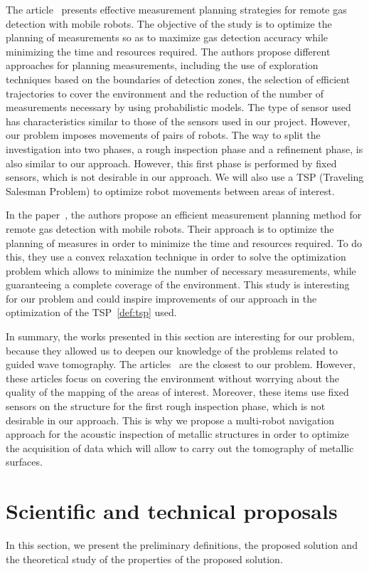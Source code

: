 \documentclass[english,RandD]{rapportPFE}  %
\begin{document}
		The article~\cite{7487624} presents effective measurement planning strategies for remote gas detection with mobile robots.
		The objective of the study is to optimize the planning of measurements so as to maximize gas detection accuracy while minimizing the time and resources required.
		The authors propose different approaches for planning measurements, including the use of exploration techniques based on the boundaries of detection zones, the selection of efficient trajectories to cover the environment and the reduction of the number of measurements necessary by using probabilistic models.
		The type of sensor used has characteristics similar to those of the sensors used in our project.
		However, our problem imposes movements of pairs of robots.
		The way to split the investigation into two phases, a rough inspection phase and a refinement phase, is also similar to our approach.
		However, this first phase is performed by fixed sensors, which is not desirable in our approach.
		We will also use a TSP (Traveling Salesman Problem) to optimize robot movements between areas of interest.

		In the paper~\cite{7139673}, the authors propose an efficient measurement planning method for remote gas detection with mobile robots.
		Their approach is to optimize the planning of measures in order to minimize the time and resources required.
		To do this, they use a convex relaxation technique in order to solve the optimization problem which allows to minimize the number of necessary measurements, while guaranteeing a complete coverage of the environment.
		This study is interesting for our problem and could inspire improvements of our approach in the optimization of the TSP~\ref{def:tsp} used.

		In summary, the works presented in this section are interesting for our problem, because they allowed us to deepen our knowledge of the problems related to guided wave tomography.
		The articles~\cite{7487624, 7139673} are the closest to our problem.
		However, these articles focus on covering the environment without worrying about the quality of the mapping of the areas of interest.
		Moreover, these items use fixed sensors on the structure for the first rough inspection phase, which is not desirable in our approach.
		This is why we propose a multi-robot navigation approach for the acoustic inspection of metallic structures in order to optimize the acquisition of data which will allow to carry out the tomography of metallic surfaces.
	\section{Scientific and technical proposals}
		In this section, we present the preliminary definitions, the proposed solution and the theoretical study of the properties of the proposed solution.
\end{document}
